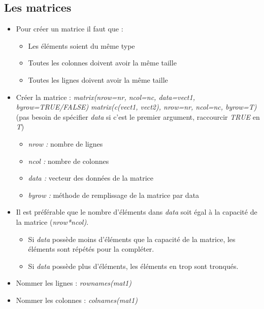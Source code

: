 \documentclass[12pt,a4paper]{article}
\begin{document}
\subsection{Les matrices}
\begin{itemize}
\item Pour créer un matrice il faut que :
\begin{itemize}
\item Les éléments soient du même type
\item Toutes les colonnes doivent avoir la même taille
\item Toutes les lignes doivent avoir la même taille
\end{itemize}
\item Créer la matrice :
\newline \textit{matrix(nrow=nr, ncol=nc, data=vect1, byrow=TRUE/FALSE)}
\newline \textit{matrix(c(vect1, vect2), nrow=nr, ncol=nc, byrow=T)} (pas besoin de spécifier \textit{data} si c'est le premier argument, raccourcir \textit{TRUE} en \textit{T})
\begin{itemize}
\item \textit{nrow : } nombre de lignes
\item \textit{ncol : } nombre de colonnes
\item \textit{data : } vecteur des données de la matrice
\item \textit{byrow : } méthode de remplissage de la matrice par data
\end{itemize}
\item Il est préférable que le nombre d'éléments dans \textit{data} soit égal à la capacité de la matrice (\textit{nrow*ncol)}.
\begin{itemize}
\item Si \textit{data} possède moins d'éléments que la capacité de la matrice, les éléments sont répétés pour la compléter.
\item Si \textit{data} possède plus d'éléments, les éléments en trop sont tronqués.
\end{itemize}
\item Nommer les lignes : \textit{rownames(mat1)}
\item Nommer les colonnes : \textit{colnames(mat1)}
\end{itemize}
\end{document}

